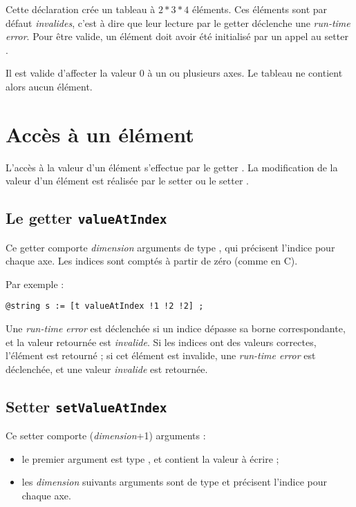 Cette déclaration crée un tableau à $2*3*4$ éléments. Ces éléments sont par défaut \emph{invalides}, c'est à dire que leur lecture par le getter  déclenche une \emph{run-time error}. Pour être valide, un élément doit avoir été initialisé par un appel au setter .

Il est valide d'affecter la valeur $0$ à un ou plusieurs axes. Le tableau ne contient alors aucun élément.


\section{Accès à un élément}

L'accès à la valeur d'un élément s'effectue par le getter . La modification de la valeur d'un élément est réalisée par le setter  ou le setter .

\subsection{Le getter \texttt{valueAtIndex}}

Ce getter comporte \emph{dimension} arguments de type , qui précisent l'indice pour chaque axe. Les indices sont comptés à partir de zéro (comme en C).

Par exemple :
\begin{lstlisting}[language=galgas]
  @string s := [t valueAtIndex !1 !2 !2] ;
\end{lstlisting}


Une \emph{run-time error} est déclenchée si un indice dépasse sa borne correspondante, et la valeur retournée est \emph{invalide}. Si les indices ont des valeurs correctes, l'élément est retourné ; si cet élément est invalide, une \emph{run-time error} est déclenchée, et une valeur \emph{invalide} est retournée.






\subsection{Setter \texttt{setValueAtIndex}}

Ce setter comporte (\emph{dimension}+1) arguments :
\begin{itemize}
  \item le premier argument est type , et contient la valeur à écrire ;
  \item les \emph{dimension} suivants arguments sont de type  et précisent l'indice pour chaque axe.
\end{itemize} 
  
